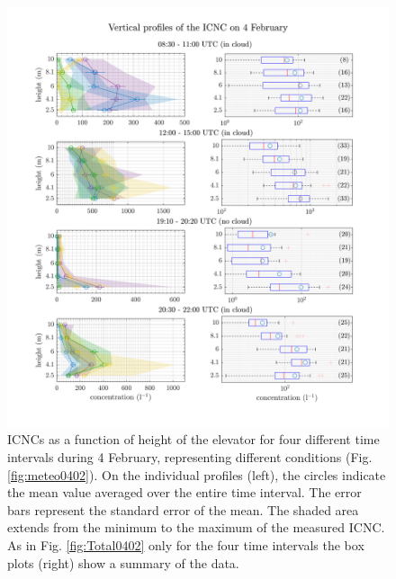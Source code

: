 \documentclass[draft,linenumbers]{agujournal}
\begin{document}
\begin{figure}[t]
 \centering
 	\includegraphics[width=14cm]{0402_Overview.png}
 \caption{ICNCs as a function of height of the elevator for four different time intervals during 4 February, representing different conditions (Fig. \ref{fig:meteo0402}). On the individual profiles (left), the circles indicate the mean value averaged over the entire time interval. The error bars represent the standard error of the mean. The shaded area extends from the minimum to the maximum of the measured ICNC. As in Fig. \ref{fig:Total0402} only for the four time intervals the box plots (right) show a summary of the data.}
 \label{fig:profiles0402}
\end{figure}
\end{document}
